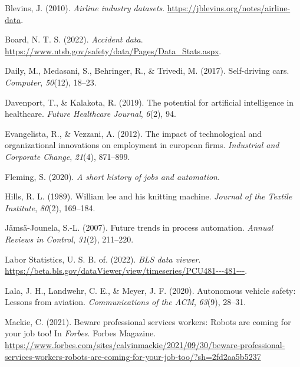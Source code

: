 \documentclass[
  man,floatsintext]{apa7}
\newlength{\cslhangindent}
\newlength{\cslentryspacingunit} %
\newenvironment{CSLReferences}[2] %
 {%
  \setlength{\parindent}{0pt}
  \ifodd #1
  \let\oldpar\par
  \def\par{\hangindent=\cslhangindent\oldpar}
  \fi
  \setlength{\parskip}{#2\cslentryspacingunit}
 }%
 {}
\begin{document}
\begin{CSLReferences}{1}{0}
\leavevmode{}%
Blevins, J. (2010). \emph{Airline industry datasets}. \url{https://jblevins.org/notes/airline-data}.

\leavevmode{}%
Board, N. T. S. (2022). \emph{Accident data}. \url{https://www.ntsb.gov/safety/data/Pages/Data_Stats.aspx}.

\leavevmode{}%
Daily, M., Medasani, S., Behringer, R., \& Trivedi, M. (2017). Self-driving cars. \emph{Computer}, \emph{50}(12), 18--23.

\leavevmode{}%
Davenport, T., \& Kalakota, R. (2019). The potential for artificial intelligence in healthcare. \emph{Future Healthcare Journal}, \emph{6}(2), 94.

\leavevmode{}%
Evangelista, R., \& Vezzani, A. (2012). The impact of technological and organizational innovations on employment in european firms. \emph{Industrial and Corporate Change}, \emph{21}(4), 871--899.

\leavevmode{}%
Fleming, S. (2020). \emph{A short history of jobs and automation}.

\leavevmode{}%
Hills, R. L. (1989). William lee and his knitting machine. \emph{Journal of the Textile Institute}, \emph{80}(2), 169--184.

\leavevmode{}%
Jämsä-Jounela, S.-L. (2007). Future trends in process automation. \emph{Annual Reviews in Control}, \emph{31}(2), 211--220.

\leavevmode{}%
Labor Statistics, U. S. B. of. (2022). \emph{BLS data viewer}. \url{https://beta.bls.gov/dataViewer/view/timeseries/PCU481---481---}.

\leavevmode{}%
Lala, J. H., Landwehr, C. E., \& Meyer, J. F. (2020). Autonomous vehicle safety: Lessons from aviation. \emph{Communications of the ACM}, \emph{63}(9), 28--31.

\leavevmode{}%
Mackie, C. (2021). Beware professional services workers: Robots are coming for your job too! In \emph{Forbes}. Forbes Magazine. \url{https://www.forbes.com/sites/calvinmackie/2021/09/30/beware-professional-services-workers-robots-are-coming-for-your-job-too/?sh=2fd2aa5b5237}


\end{CSLReferences}
\end{document}
